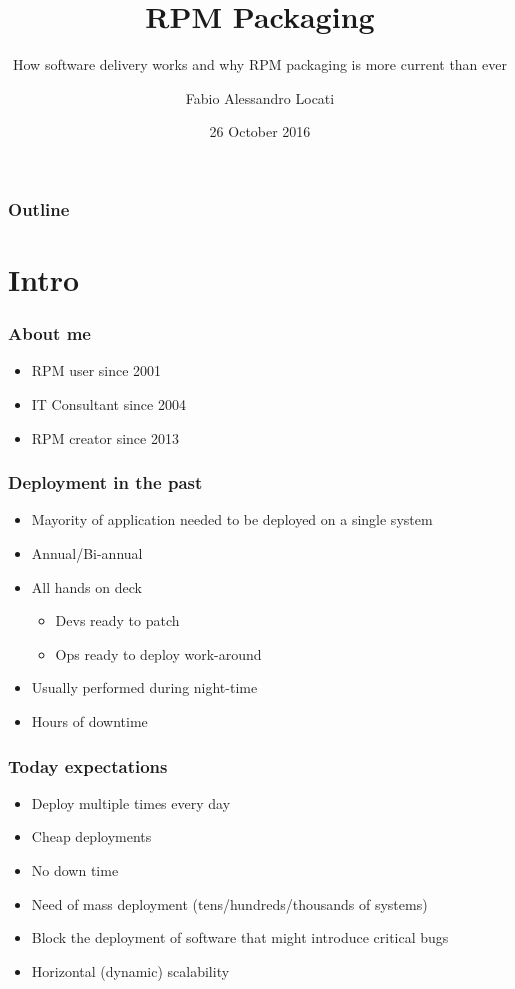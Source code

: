 \documentclass[t,aspectratio=169]{beamer}
\title{RPM Packaging}
\subtitle{How software delivery works and why RPM packaging is more current than ever}
\author{Fabio Alessandro Locati}
\date{26 October 2016}
\begin{document}
\maketitle

\begin{frame}
    \frametitle{Outline}
    \tableofcontents
\end{frame}

\section{Intro}
\begin{frame}
    \frametitle{About me}
    \begin{itemize}
        \item<2-> RPM user since 2001
        \item<3-> IT Consultant since 2004
        \item<4-> RPM creator since 2013
    \end{itemize}
\end{frame}

\begin{frame}
    \frametitle{Deployment in the past}
    \begin{itemize}
        \item<2-> Mayority of application needed to be deployed on a single system
        \item<3-> Annual/Bi-annual
        \item<4-> All hands on deck
        \begin{itemize}
            \item<5-> Devs ready to patch
            \item<6-> Ops ready to deploy work-around
        \end{itemize}
        \item<7-> Usually performed during night-time
        \item<8-> Hours of downtime
    \end{itemize}
\end{frame}

\begin{frame}
    \frametitle{Today expectations}
    \begin{itemize}
        \item<2-> Deploy multiple times every day
        \item<3-> Cheap deployments
        \item<4-> No down time
        \item<5-> Need of mass deployment (tens/hundreds/thousands of systems)
        \item<6-> Block the deployment of software that might introduce critical bugs
        \item<7-> Horizontal (dynamic) scalability
    \end{itemize}
\end{frame}
\end{document}
